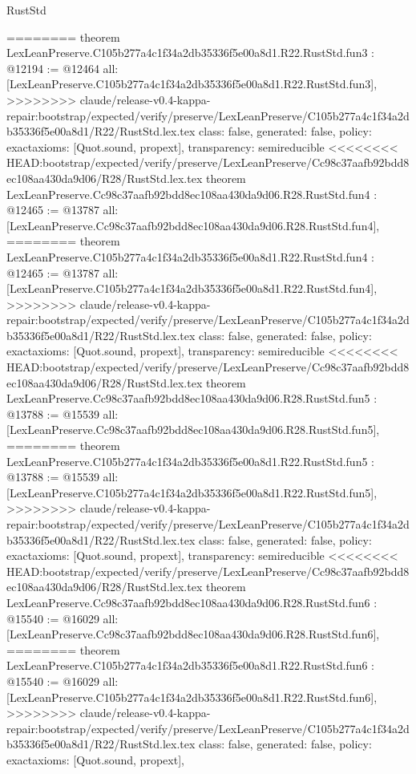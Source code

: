 \begin{lexlean}{RustStd}
\begin{coremodule}
{\begin{coremodule}
{{{{{{========
theorem LexLeanPreserve.C105b277a4c1f34a2db35336f5e00a8d1.R22.RustStd.fun3 : @12194 := @12464 {
  all: [LexLeanPreserve.C105b277a4c1f34a2db35336f5e00a8d1.R22.RustStd.fun3],
>>>>>>>> claude/release-v0.4-kappa-repair:bootstrap/expected/verify/preserve/LexLeanPreserve/C105b277a4c1f34a2db35336f5e00a8d1/R22/RustStd.lex.tex
  class: false,
  generated: false,
  policy: exact{axioms: [Quot.sound, propext]},
  transparency: semireducible
}
<<<<<<<< HEAD:bootstrap/expected/verify/preserve/LexLeanPreserve/Cc98c37aafb92bdd8ec108aa430da9d06/R28/RustStd.lex.tex
theorem LexLeanPreserve.Cc98c37aafb92bdd8ec108aa430da9d06.R28.RustStd.fun4 : @12465 := @13787 {
  all: [LexLeanPreserve.Cc98c37aafb92bdd8ec108aa430da9d06.R28.RustStd.fun4],
========
theorem LexLeanPreserve.C105b277a4c1f34a2db35336f5e00a8d1.R22.RustStd.fun4 : @12465 := @13787 {
  all: [LexLeanPreserve.C105b277a4c1f34a2db35336f5e00a8d1.R22.RustStd.fun4],
>>>>>>>> claude/release-v0.4-kappa-repair:bootstrap/expected/verify/preserve/LexLeanPreserve/C105b277a4c1f34a2db35336f5e00a8d1/R22/RustStd.lex.tex
  class: false,
  generated: false,
  policy: exact{axioms: [Quot.sound, propext]},
  transparency: semireducible
}
<<<<<<<< HEAD:bootstrap/expected/verify/preserve/LexLeanPreserve/Cc98c37aafb92bdd8ec108aa430da9d06/R28/RustStd.lex.tex
theorem LexLeanPreserve.Cc98c37aafb92bdd8ec108aa430da9d06.R28.RustStd.fun5 : @13788 := @15539 {
  all: [LexLeanPreserve.Cc98c37aafb92bdd8ec108aa430da9d06.R28.RustStd.fun5],
========
theorem LexLeanPreserve.C105b277a4c1f34a2db35336f5e00a8d1.R22.RustStd.fun5 : @13788 := @15539 {
  all: [LexLeanPreserve.C105b277a4c1f34a2db35336f5e00a8d1.R22.RustStd.fun5],
>>>>>>>> claude/release-v0.4-kappa-repair:bootstrap/expected/verify/preserve/LexLeanPreserve/C105b277a4c1f34a2db35336f5e00a8d1/R22/RustStd.lex.tex
  class: false,
  generated: false,
  policy: exact{axioms: [Quot.sound, propext]},
  transparency: semireducible
}
<<<<<<<< HEAD:bootstrap/expected/verify/preserve/LexLeanPreserve/Cc98c37aafb92bdd8ec108aa430da9d06/R28/RustStd.lex.tex
theorem LexLeanPreserve.Cc98c37aafb92bdd8ec108aa430da9d06.R28.RustStd.fun6 : @15540 := @16029 {
  all: [LexLeanPreserve.Cc98c37aafb92bdd8ec108aa430da9d06.R28.RustStd.fun6],
========
theorem LexLeanPreserve.C105b277a4c1f34a2db35336f5e00a8d1.R22.RustStd.fun6 : @15540 := @16029 {
  all: [LexLeanPreserve.C105b277a4c1f34a2db35336f5e00a8d1.R22.RustStd.fun6],
>>>>>>>> claude/release-v0.4-kappa-repair:bootstrap/expected/verify/preserve/LexLeanPreserve/C105b277a4c1f34a2db35336f5e00a8d1/R22/RustStd.lex.tex
  class: false,
  generated: false,
  policy: exact{axioms: [Quot.sound, propext]},
}}}}}}}}}}
\end{coremodule}}
\end{coremodule}
\end{lexlean}
